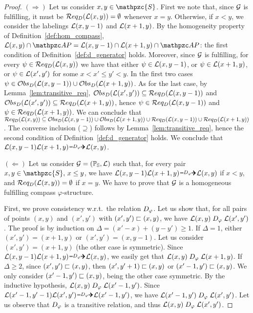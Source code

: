\begin{proof}
$(\Rightarrow)$
Let us consider $x,y \in \mathpzc{S}$.
First we note that, since $\mathcal{G}$ is fulfilling, it must be $\mathcal{R} eq_D(\mathcal{L}(x,y))=\emptyset$ whenever $x=y$.
Otherwise, if $x<y$, we consider the labelings $\mathcal{L}(x,y-1)$ and $\mathcal{L}(x+1, y)$. By the homogeneity property
of Definition~\ref{def:hom_compass}, $\cL(x,y)\cap\AP = \cL(x,y-1) \cap \cL(x+1,y)\cap \AP$: the first condition 
of Definition~\ref{def:d_generator} holds. 
Moreover,
since $\mathcal{G}$ is fulfilling, for every $\psi \in \mathcal{R} eq_D(\mathcal{L}(x,y))$ we have that either $\psi\in \mathcal{L}(x,y-1)$, or   $\psi\in \mathcal{L}(x+1,y)$, or $\psi \in \mathcal{L}(x',y')$
for some $x<x'\leq y'<y$. In the first two cases $\psi \in \mathcal{O} bs_D(\mathcal{L}(x,y-1)) \cup \mathcal{O} bs_D(\mathcal{L}(x+1,y))$. As for the last case,  by Lemma~\ref{lem:transitive_req}, $\mathcal{O} bs_D(\mathcal{L}(x',y'))\subseteq \mathcal{R} eq_D(\mathcal{L}(x,y-1))$ and $\mathcal{O} bs_D(\mathcal{L}(x',y'))\subseteq \mathcal{R} eq_D(\mathcal{L}(x+1,y))$,
hence
$\psi \in \mathcal{R} eq_D(\mathcal{L}(x,y-1))$ and  $\psi \in \mathcal{R} eq_D(\mathcal{L}(x+1,y))$.
We can conclude that $\mathcal{R} eq_D(\mathcal{L}(x,y))\subseteq\mathcal{O} bs_D(\mathcal{L}(x,y-1)) \cup \mathcal{O} bs_D(\mathcal{L}(x+1,y)) \cup  \mathcal{R} eq_D(\mathcal{L}(x,y-1)) \cup \mathcal{R} eq_D(\mathcal{L}(x+1,y))$. The converse inclusion ($\supseteq$) follows by Lemma~\ref{lem:transitive_req}, hence the second condition of Definition~\ref{def:d_generator} holds. We conclude that $\cL(x,y-1)\cL(x+1, y)\genDphi \cL(x, y)$.

$(\Leftarrow)$ Let us consider $\mathcal{G}=(\mathbb{P}_{\mathbb{S}},\mathcal{L})$ such that, for every pair $x,y \in \mathpzc{S},\, x\leq y$, we have $\cL(x,y-1)\cL(x+1, y)\genDphi \cL(x, y)$ if $x<y$, and $\mathcal{R} eq_D(\mathcal{L}(x,y))=\emptyset$ if $x=y$. We have to prove that $\mathcal{G}$ is a homogeneous fulfilling compass $\varphi$-structure. 

First, we prove consistency w.r.t.\ the relation $\mathrel{D_\varphi}$.
Let us show that, for all pairs of 
points $(x,y)$ and $(x',y')$ with $(x',y')\sqsubset(x,y)$,
we have $\mathcal{L}(x,y)\mathrel{D_\varphi}\mathcal{L}(x',y')$. 
The proof is by induction on $\Delta =(x'-x) + (y - y')\geq 1$.
If $\Delta=1$, either $(x',y')=(x+1,y)$
or $(x',y')=(x,y-1)$. Let us consider $(x',y')=(x+1,y)$
(the other case is symmetric). Since 
$\cL(x,y-1)\cL(x+1, y)\genDphi \cL(x, y)$,
we easily get that $\mathcal{L}(x,y)\mathrel{D_\varphi} \mathcal{L}(x+1, y)$.
If $\Delta \geq 2$, 
since $(x',y')\sqsubset(x,y)$, then
$(x',y'+1)\sqsubset(x,y)$
or $(x'-1,y')\sqsubset(x,y)$. We only consider
$(x'-1,y')\sqsubset(x,y)$, being the other case symmetric. By the inductive hypothesis, 
$\mathcal{L}(x,y)\mathrel{D_\varphi} \mathcal{L}(x'-1,y')$.
Since $\cL(x'-1,y'-1)\cL(x', y')\genDphi \cL(x'-1, y')$,
we have $\mathcal{L}(x'-1, y')\mathrel{D_\varphi} \mathcal{L}(x',y')$.
 Let us observe that $\mathrel{D_\varphi}$ is a transitive relation,
and thus $\mathcal{L}(x, y)\mathrel{D_\varphi} \mathcal{L}(x',y')$.


\end{proof}
